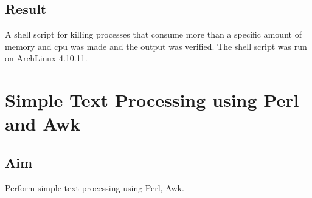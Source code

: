 \documentclass{article}
\begin{document}
\subsection{Result}
A shell script for killing processes that consume more than a specific amount of memory and cpu was made and the output was verified. The shell script was run on ArchLinux 4.10.11.

\begin{refsection}
\cite{shellbible}
\cite{shellbook}
\printbibliography
\end{refsection}

\newpage
\section{Simple Text Processing using Perl and Awk}

\subsection{Aim}
Perform simple text processing using Perl, Awk.
\end{document}

